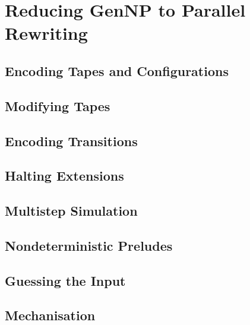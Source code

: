 \chapter{Reducing GenNP to Parallel Rewriting}


\section{Encoding Tapes and Configurations}

\section{Modifying Tapes}

\section{Encoding Transitions}

\section{Halting Extensions}

\section{Multistep Simulation}

\section{Nondeterministic Preludes}

\section{Guessing the Input}

\section{Mechanisation}
